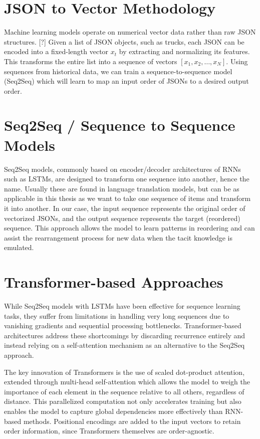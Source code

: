 \documentclass[12pt,a4paper]{report}
\begin{document}
\section{JSON to Vector Methodology}
Machine learning models operate on numerical vector data rather than raw JSON structures. [?] Given a list of JSON objects, such as trucks, each JSON can be encoded into a fixed-length vector $x_t$ by extracting and normalizing its features. This transforms the entire list into a sequence of vectors ${[x_1, x_2, \dots, x_N]}$. Using sequences from historical data, we can train a sequence-to-sequence model (Seq2Seq) which will learn to map an input order of JSONs to a desired output order. 

\section{Seq2Seq / Sequence to Sequence Models}
Seq2Seq models, commonly based on encoder/decoder architectures of RNNs such as LSTMs, are designed to transform one sequence into another, hence the name. Usually these are found in language translation models, but can be as applicable in this thesis as we want to take one sequence of items and transform it into another. In our case, the input sequence represents the original order of vectorized JSONs, and the output sequence represents the target (reordered) sequence. \cite{ref2}\cite{ref3} This approach allows the model to learn patterns in reordering and can assist the rearrangement process for new data when the tacit knowledge is emulated. 

\section{Transformer-based Approaches}

While Seq2Seq models with LSTMs have been effective for sequence learning tasks, they suffer from limitations in handling very long sequences due to vanishing gradients and sequential processing bottlenecks. Transformer-based architectures address these shortcomings by discarding recurrence entirely and instead relying on a self-attention mechanism as an alternative to the Seq2Seq approach.

The key innovation of Transformers is the use of scaled dot-product attention, extended through multi-head self-attention which allows the model to weigh the importance of each element in the sequence relative to all others, regardless of distance. This parallelized computation not only accelerates training but also enables the model to capture global dependencies more effectively than RNN-based methods. Positional encodings are added to the input vectors to retain order information, since Transformers themselves are order-agnostic.\cite{ref5} 
\end{document}
